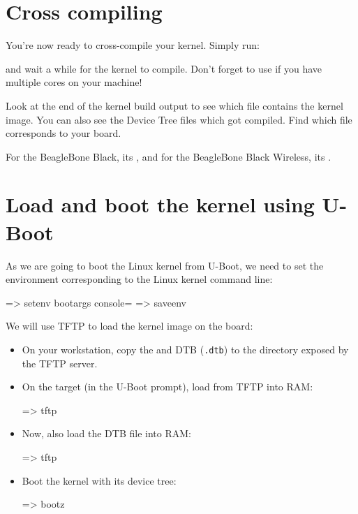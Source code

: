 \section{Cross compiling}

You're now ready to cross-compile your kernel. Simply run:


and wait a while for the kernel to compile. Don't forget to use
 if you have multiple cores on your machine!

Look at the end of the kernel build output to see which file contains
the kernel image. You can also see the Device Tree  files
which got compiled. Find which  file corresponds to your
board.

{For the BeagleBone Black, its ,
and for the BeagleBone Black Wireless, its
.}
{}

\section{Load and boot the kernel using U-Boot}

As we are going to boot the Linux kernel from U-Boot,
we need to set the  environment corresponding
to the Linux kernel command line:

\begin{ubootinput}
=> setenv bootargs console=%
=> saveenv
\end{ubootinput}
We will use TFTP to load the kernel image on the board:

\begin{itemize}

\item On your workstation, copy the  and DTB
(\texttt{\dtname}\texttt{.dtb}) to the directory exposed by the TFTP server.

\item On the target (in the U-Boot prompt), load  from
TFTP into RAM:
\begin{ubootinput}
=> tftp %
\end{ubootinput}

\item Now, also load the DTB file into RAM:
\begin{ubootinput}
=> tftp %
\end{ubootinput}

\item Boot the kernel with its device tree:
\begin{ubootinput}
=> bootz %
\end{ubootinput}

\end{itemize}

